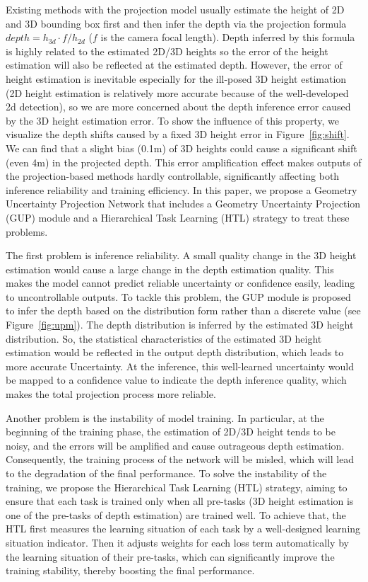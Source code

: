 \documentclass[10pt,twocolumn,letterpaper]{article}
\begin{document}
Existing methods with the projection model usually estimate the height of 2D and 3D bounding box first and then infer the depth via the projection formula $depth=h_{3d}\cdot f/h_{2d}$ ($f$ is the camera focal length). Depth inferred by this formula is highly related to the estimated 2D/3D heights so the error of the height estimation will also be reflected at the estimated depth. However, the error of height estimation is inevitable especially for the ill-posed 3D height estimation (2D height estimation is relatively more accurate because of the well-developed 2d detection), so we are more concerned about the depth inference error caused by the 3D height estimation error. To show the influence of this property, we visualize the depth shifts caused by a fixed 3D height error in Figure~\ref{fig:shift}.
We can find that a slight bias (0.1m) of 3D heights could cause a significant shift (even 4m) in the projected depth.
This error amplification effect makes outputs of the projection-based methods hardly controllable, significantly affecting both inference reliability and training efficiency. In this paper, we propose a Geometry Uncertainty Projection Network that includes a Geometry Uncertainty Projection (GUP) module and a Hierarchical Task Learning (HTL) strategy to treat these problems.

The first problem is inference reliability. A small quality change in the 3D height estimation would cause a large change in the depth estimation quality. This makes the model cannot predict reliable uncertainty or confidence easily, leading to uncontrollable outputs. To tackle this problem, the GUP module is proposed to infer the depth based on the distribution form rather than a discrete value (see Figure~\ref{fig:upm}). The depth distribution is inferred by the estimated 3D height distribution. So, the statistical characteristics of the estimated 3D height estimation would be reflected in the output depth distribution, which leads to more accurate Uncertainty. At the inference, this well-learned uncertainty would be mapped to a confidence value to indicate the depth inference quality, which makes the total projection process more reliable.   


Another problem is the instability of model training.
In particular, at the beginning of the training phase, the estimation of 2D/3D height tends to be noisy, and the errors will be amplified and cause outrageous depth estimation.
Consequently, the training process of the network will be misled, which will lead to the degradation of the final performance.
To solve the instability of the training, we propose the Hierarchical Task Learning (HTL) strategy, aiming to ensure that each task is trained only when all pre-tasks (\eg 3D height estimation is one of the pre-tasks of depth estimation) are trained well. 
To achieve that, the HTL first measures the learning situation of each task by a well-designed learning situation indicator.
Then it adjusts weights for each loss term automatically by the learning situation of their pre-tasks, which can significantly improve the training stability, thereby boosting the final performance.
\end{document}
